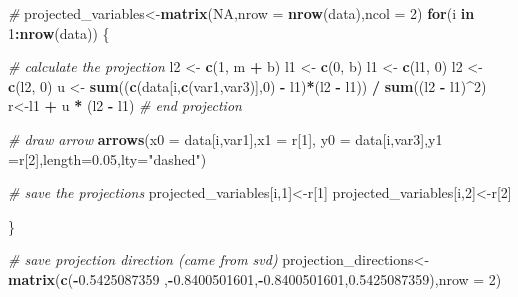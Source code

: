 \documentclass[
]{book}
\newenvironment{Shaded}{\begin{snugshade}}{\end{snugshade}}
\newcommand{\CommentTok}[1]{\textcolor[rgb]{0.56,0.35,0.01}{\textit{#1}}}
\newcommand{\ControlFlowTok}[1]{\textcolor[rgb]{0.13,0.29,0.53}{\textbf{#1}}}
\newcommand{\DataTypeTok}[1]{\textcolor[rgb]{0.13,0.29,0.53}{#1}}
\newcommand{\DecValTok}[1]{\textcolor[rgb]{0.00,0.00,0.81}{#1}}
\newcommand{\FloatTok}[1]{\textcolor[rgb]{0.00,0.00,0.81}{#1}}
\newcommand{\KeywordTok}[1]{\textcolor[rgb]{0.13,0.29,0.53}{\textbf{#1}}}
\newcommand{\NormalTok}[1]{#1}
\newcommand{\OperatorTok}[1]{\textcolor[rgb]{0.81,0.36,0.00}{\textbf{#1}}}
\newcommand{\OtherTok}[1]{\textcolor[rgb]{0.56,0.35,0.01}{#1}}
\newcommand{\StringTok}[1]{\textcolor[rgb]{0.31,0.60,0.02}{#1}}
\theoremstyle{definition}
\theoremstyle{definition}
\theoremstyle{definition}
\theoremstyle{remark}
\begin{document}
\begin{Shaded}
\begin{Highlighting}[]
\CommentTok{#}
\NormalTok{projected_variables<-}\KeywordTok{matrix}\NormalTok{(}\OtherTok{NA}\NormalTok{,}\DataTypeTok{nrow =} \KeywordTok{nrow}\NormalTok{(data),}\DataTypeTok{ncol =} \DecValTok{2}\NormalTok{)}
\ControlFlowTok{for}\NormalTok{(i }\ControlFlowTok{in} \DecValTok{1}\OperatorTok{:}\KeywordTok{nrow}\NormalTok{(data))}
\NormalTok{\{}

\CommentTok{# calculate the projection}
\NormalTok{l2 <-}\StringTok{ }\KeywordTok{c}\NormalTok{(}\DecValTok{1}\NormalTok{, m }\OperatorTok{+}\StringTok{ }\NormalTok{b)}
\NormalTok{l1 <-}\StringTok{ }\KeywordTok{c}\NormalTok{(}\DecValTok{0}\NormalTok{, b)}
\NormalTok{l1 <-}\StringTok{ }\KeywordTok{c}\NormalTok{(l1, }\DecValTok{0}\NormalTok{)}
\NormalTok{l2 <-}\StringTok{ }\KeywordTok{c}\NormalTok{(l2, }\DecValTok{0}\NormalTok{)}
\NormalTok{u <-}\StringTok{ }\KeywordTok{sum}\NormalTok{((}\KeywordTok{c}\NormalTok{(data[i,}\KeywordTok{c}\NormalTok{(var1,var3)],}\DecValTok{0}\NormalTok{) }\OperatorTok{-}\StringTok{ }\NormalTok{l1)}\OperatorTok{*}\NormalTok{(l2 }\OperatorTok{-}\StringTok{ }\NormalTok{l1)) }\OperatorTok{/}\StringTok{ }\KeywordTok{sum}\NormalTok{((l2 }\OperatorTok{-}\StringTok{ }\NormalTok{l1)}\OperatorTok{^}\DecValTok{2}\NormalTok{)}
\NormalTok{r<-l1 }\OperatorTok{+}\StringTok{ }\NormalTok{u }\OperatorTok{*}\StringTok{ }\NormalTok{(l2 }\OperatorTok{-}\StringTok{ }\NormalTok{l1)}
\CommentTok{# end projection}

\CommentTok{# draw arrow}
  \KeywordTok{arrows}\NormalTok{(}\DataTypeTok{x0 =}\NormalTok{ data[i,var1],}\DataTypeTok{x1 =}\NormalTok{ r[}\DecValTok{1}\NormalTok{],}
           \DataTypeTok{y0 =}\NormalTok{ data[i,var3],}\DataTypeTok{y1 =}\NormalTok{r[}\DecValTok{2}\NormalTok{],}\DataTypeTok{length=}\FloatTok{0.05}\NormalTok{,}\DataTypeTok{lty=}\StringTok{"dashed"}\NormalTok{)}


\CommentTok{# save the projections}
\NormalTok{projected_variables[i,}\DecValTok{1}\NormalTok{]<-r[}\DecValTok{1}\NormalTok{]}
\NormalTok{projected_variables[i,}\DecValTok{2}\NormalTok{]<-r[}\DecValTok{2}\NormalTok{]}

\NormalTok{\}}

\CommentTok{# save projection direction (came from svd)}
\NormalTok{projection_directions<-}\KeywordTok{matrix}\NormalTok{(}\KeywordTok{c}\NormalTok{(}\OperatorTok{-}\FloatTok{0.5425087359}\NormalTok{ ,}\OperatorTok{-}\FloatTok{0.8400501601}\NormalTok{,}\OperatorTok{-}\FloatTok{0.8400501601}\NormalTok{,}\FloatTok{0.5425087359}\NormalTok{),}\DataTypeTok{nrow =} \DecValTok{2}\NormalTok{)}


\end{Highlighting}
\end{Shaded}
\end{document}
